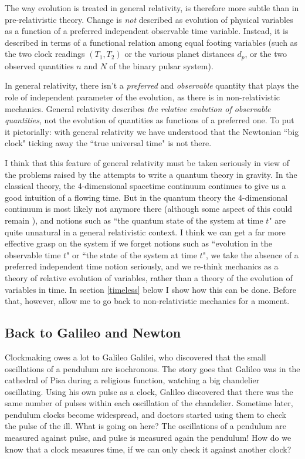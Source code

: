 \documentclass[10pt,nofootinbib]{revtex4}
\begin{document}
The way evolution is treated in general relativity, is therefore more subtle than in pre-relativistic theory.   Change is \emph{not} described as evolution of physical variables as a function of a preferred independent observable time variable.  Instead, it is described in terms of a functional relation among equal footing variables (such as the two clock readings $(T_1,T_2)$ or the various planet distances $d_p$, or the two observed quantities $n$ and $N$ of the binary pulsar system).   

In general relativity, there isn't a \emph{preferred} and \emph{observable} quantity that plays the role of independent parameter of the evolution, as there is in non-relativistic mechanics.   General relativity describes {\em the relative evolution of observable quantities}, not the evolution of quantities as functions of a preferred one.   To put it pictorially: with general relativity we have understood that the Newtonian ``big clock" ticking away the ``true universal time"  is not there. 

I think that this feature of general relativity must be taken seriously in view of the problems raised by the attempts to write a quantum theory in gravity.  In the classical theory, the 4-dimensional spacetime continuum continues to give us a good intuition of a flowing time.   But in the quantum theory the 4-dimensional continuum is most likely not anymore there (although some aspect of this could remain \cite{Baez:1997zt}), and notions such as ``the quantum state of the system at time $t$" are quite unnatural in a general relativistic context.   I think we can get a far more effective grasp on the system if we forget notions such as ``evolution in the observable time $t$" or  ``the state of the system at time $t$",  we take the absence of a preferred independent time notion seriously, and we re-think mechanics as a theory of relative evolution of variables, rather than a theory of the evolution of variables in time.   In section \ref{timeless} below I show how this can be 
 done.  Before that, however, allow me to go back to non-relativistic mechanics for a moment. 

\subsection{Back to Galileo and Newton}

Clockmaking owes a lot to Galileo Galilei, who discovered that the small oscillations of a pendulum are isochronous.  The story goes that Galileo was in the cathedral of Pisa during a religious function, watching a big chandelier oscillating.  Using his own pulse as a clock, Galileo discovered that there was the same number of pulses within each oscillation of the chandelier.   Sometime later, pendulum clocks become widespread, and doctors started using them to check the pulse of the ill.    What is going on here?  The oscillations of a pendulum are measured against pulse, and pulse is measured again the pendulum!  How do we know that a clock measures time, if we can only check it against another clock? 
\end{document}
